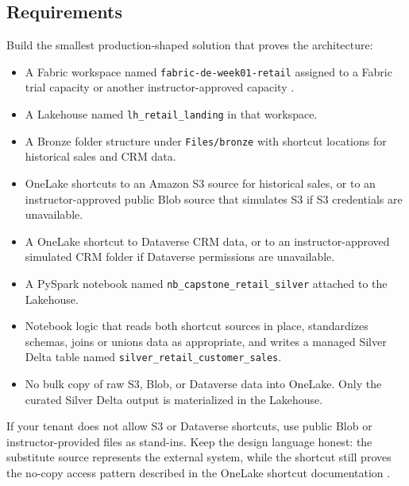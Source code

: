 \subsection*{Requirements}
Build the smallest production-shaped solution that proves the architecture:
\begin{itemize}
    \item A Fabric workspace named \texttt{fabric-de-week01-retail} assigned to a Fabric trial capacity or another instructor-approved capacity \cite{microsoftFabricTrial}.
    \item A Lakehouse named \texttt{lh\_retail\_landing} in that workspace.
    \item A Bronze folder structure under \texttt{Files/bronze} with shortcut locations for historical sales and CRM data.
    \item OneLake shortcuts to an Amazon S3 source for historical sales, or to an instructor-approved public Blob source that simulates S3 if S3 credentials are unavailable.
    \item A OneLake shortcut to Dataverse CRM data, or to an instructor-approved simulated CRM folder if Dataverse permissions are unavailable.
    \item A PySpark notebook named \texttt{nb\_capstone\_retail\_silver} attached to the Lakehouse.
    \item Notebook logic that reads both shortcut sources in place, standardizes schemas, joins or unions data as appropriate, and writes a managed Silver Delta table named \texttt{silver\_retail\_customer\_sales}.
    \item No bulk copy of raw S3, Blob, or Dataverse data into OneLake. Only the curated Silver Delta output is materialized in the Lakehouse.
\end{itemize}

\begin{notebox}
If your tenant does not allow S3 or Dataverse shortcuts, use public Blob or instructor-provided files as stand-ins. Keep the design language honest: the substitute source represents the external system, while the shortcut still proves the no-copy access pattern described in the OneLake shortcut documentation \cite{microsoftOneLakeShortcuts}.
\end{notebox}

